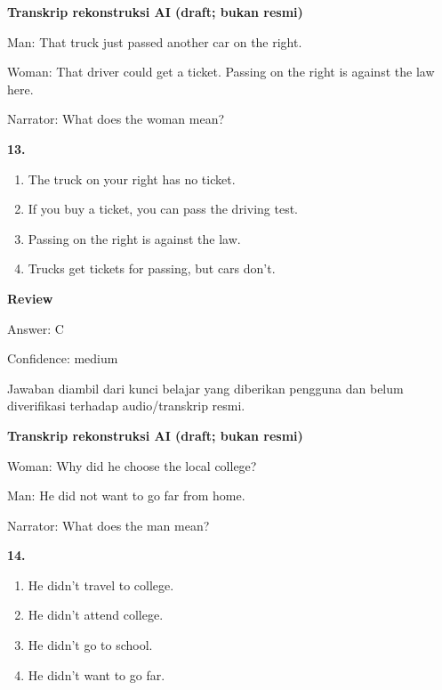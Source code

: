\documentclass[12pt]{article}
\begin{document}
\endgroup
\par
\vspace{0.25\baselineskip}
\begin{exampleblock}
\textbf{Transkrip rekonstruksi AI (draft; bukan resmi)}\par
Man: That truck just passed another car on the right.\par
Woman: That driver could get a ticket. Passing on the right is against the law here.\par
Narrator: What does the woman mean?\par
\end{exampleblock}
\noindent\textbf{13.}
\begin{enumerate}[label=(\Alph*),leftmargin=*,itemsep=0.2em]
\item The truck on your right has no ticket.
\item If you buy a ticket, you can pass the driving test.
\item Passing on the right is against the law.
\item Trucks get tickets for passing, but cars don't.
\end{enumerate}
\par
\begingroup
\setlength{\parskip}{0pt}
\setlength{\parindent}{0pt}
\textbf{Review}\par
Answer: C\par
Confidence: medium\par
Jawaban diambil dari kunci belajar yang diberikan pengguna dan belum diverifikasi terhadap audio/transkrip resmi.\par
\endgroup
\par
\vspace{0.25\baselineskip}
\begin{exampleblock}
\textbf{Transkrip rekonstruksi AI (draft; bukan resmi)}\par
Woman: Why did he choose the local college?\par
Man: He did not want to go far from home.\par
Narrator: What does the man mean?\par
\end{exampleblock}
\noindent\textbf{14.}
\begin{enumerate}[label=(\Alph*),leftmargin=*,itemsep=0.2em]
\item He didn't travel to college.
\item He didn't attend college.
\item He didn't go to school.
\item He didn't want to go far.
\end{enumerate}
\end{document}
